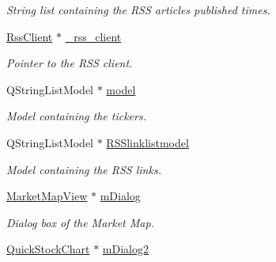 \begin{DoxyCompactItemize}
\begin{DoxyCompactList}\small\item\em String list containing the R\+S\+S articles published times. \end{DoxyCompactList}\item 
\hypertarget{class_t_k_r_t_a_p_ac88066b0fa124f52e8755b8d0e034c66}{\hyperlink{class_rss_client}{Rss\+Client} $\ast$ \hyperlink{class_t_k_r_t_a_p_ac88066b0fa124f52e8755b8d0e034c66}{\+\_\+rss\+\_\+client}}\label{class_t_k_r_t_a_p_ac88066b0fa124f52e8755b8d0e034c66}

\begin{DoxyCompactList}\small\item\em Pointer to the R\+S\+S client. \end{DoxyCompactList}\item 
\hypertarget{class_t_k_r_t_a_p_a01c02cbbb5b6939837aaf07ff86c3d99}{Q\+String\+List\+Model $\ast$ \hyperlink{class_t_k_r_t_a_p_a01c02cbbb5b6939837aaf07ff86c3d99}{model}}\label{class_t_k_r_t_a_p_a01c02cbbb5b6939837aaf07ff86c3d99}

\begin{DoxyCompactList}\small\item\em Model containing the tickers. \end{DoxyCompactList}\item 
\hypertarget{class_t_k_r_t_a_p_a8b4b0e92489a64cf5cd8276f77e6da9a}{Q\+String\+List\+Model $\ast$ \hyperlink{class_t_k_r_t_a_p_a8b4b0e92489a64cf5cd8276f77e6da9a}{R\+S\+Slinklistmodel}}\label{class_t_k_r_t_a_p_a8b4b0e92489a64cf5cd8276f77e6da9a}

\begin{DoxyCompactList}\small\item\em Model containing the R\+S\+S links. \end{DoxyCompactList}\item 
\hypertarget{class_t_k_r_t_a_p_aeef7fe3150545933ebe5f6043d2eb765}{\hyperlink{class_market_map_view}{Market\+Map\+View} $\ast$ \hyperlink{class_t_k_r_t_a_p_aeef7fe3150545933ebe5f6043d2eb765}{m\+Dialog}}\label{class_t_k_r_t_a_p_aeef7fe3150545933ebe5f6043d2eb765}

\begin{DoxyCompactList}\small\item\em Dialog box of the Market Map. \end{DoxyCompactList}\item 
\hypertarget{class_t_k_r_t_a_p_abac3af7f25f39fb36ba72118cf210a9c}{\hyperlink{class_quick_stock_chart}{Quick\+Stock\+Chart} $\ast$ \hyperlink{class_t_k_r_t_a_p_abac3af7f25f39fb36ba72118cf210a9c}{m\+Dialog2}}\label{class_t_k_r_t_a_p_abac3af7f25f39fb36ba72118cf210a9c}


\end{DoxyCompactItemize}
